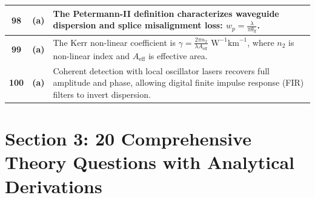 {\begin{tabularx}{\textwidth}{|c|c|X|}
\textbf{98} & \textbf{(a)} & The Petermann-II definition characterizes waveguide dispersion and splice misalignment loss: $w_p = \frac{\lambda}{\pi \theta_{\text{ff}}}$. \\ \hline
\textbf{99} & \textbf{(a)} & The Kerr non-linear coefficient is $\gamma = \frac{2\pi n_2}{\lambda A_{\text{eff}}}\text{ W}^{-1}\text{km}^{-1}$, where $n_2$ is non-linear index and $A_{\text{eff}}$ is effective area. \\ \hline
\textbf{100} & \textbf{(a)} & Coherent detection with local oscillator lasers recovers full amplitude and phase, allowing digital finite impulse response (FIR) filters to invert dispersion. \\ \hline
\end{tabularx}
}


\newpage
\section{Section 3: 20 Comprehensive Theory Questions with Analytical Derivations}

